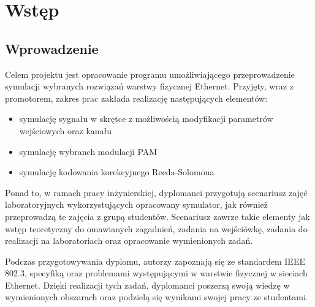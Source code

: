 \section{Wstęp}
\subsection{Wprowadzenie}

Celem projektu jest opracowanie programu umożliwiającego przeprowadzenie symulacji wybranych rozwiązań warstwy fizycznej Ethernet.
Przyjęty, wraz z promotorem, zakres prac zakłada realizację następujących elementów:
\begin{itemize}
    \item symulację sygnału w skrętce z możliwością modyfikacji parametrów wejściowych oraz kanału
    \item symulację wybranch modulacji PAM
    \item symulację kodowania korekcyjnego Reeda-Solomona
\end{itemize}

Ponad to, w ramach pracy inżynierskiej, dyplomanci przygotują scenariusz zajęć laboratoryjnych wykorzystujących opracowany symulator, jak
również przeprowadzą te zajęcia z grupą studentów. Scenariusz zawrze takie elementy jak wstęp teoretyczny do omawianych zagadnień,
zadania na wejściówkę, zadania do realizacji na laboratoriach oraz opracowanie wymienionych zadań.

Podczas przygotowywania dyplomu, autorzy zapoznają się ze standardem IEEE 802.3, specyfiką oraz problemami występującymi w warstwie fizycznej
w sieciach Ethernet. Dzięki realizacji tych zadań, dyplomanci poszerzą swoją wiedzę w wymienionych obszarach oraz podzielą się wynikami
swojej pracy ze studentami.
